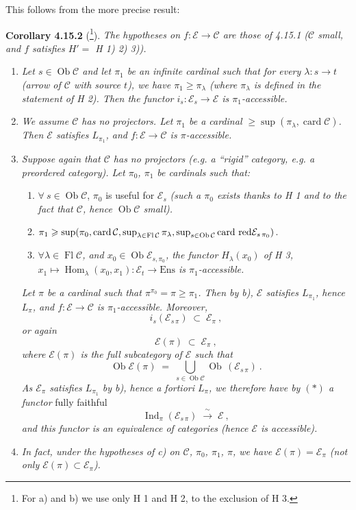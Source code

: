 \documentclass[11pt]{article}
\newcommand{\printedpage}[1]{\marginpar{\footnotesize p.~#1}}
\newcommand{\msp}[1]{\marginpar{\footnotesize [#1]}}
\newcommand{\cE}{\mathcal{E}}
\newcommand{\cC}{\mathcal{C}}
\newcommand{\Ob}{\operatorname{Ob}}
\newcommand{\Fl}{\operatorname{Fl}}
\newcommand{\Hom}{\operatorname{Hom}}
\newcommand{\Ind}{\operatorname{Ind}}
\newcommand{\Ens}{\mathrm{Ens}}
\newcommand{\card}{\operatorname{card}}
\newcommand{\cardred}{\operatorname{card}\,\text{\upshape red}}
\begin{document}
This follows from the more precise result:

\printedpage{162}

\msp{page 426}
\textbf{Corollary 4.15.2} (\footnote{For a) and b) we use only H 1 and H 2, to the exclusion of H 3.}). \textit{The hypotheses on $f : \cE \longrightarrow \cC$ are those of 4.15.1 ($\cC$ small, and $f$ satisfies $H' =$ H 1) 2) 3)).}
\begin{enumerate}
\item[\textit{a)}] \textit{Let $s \in \Ob\cC$ and let $\pi_1$ be an infinite cardinal such that for every $\lambda : s \longrightarrow t$ (arrow of $\cC$ with source $t$), we have $\pi_1 \geqslant \pi_\lambda$ (where $\pi_\lambda$ is defined in the statement of H 2). Then the functor $i_s : \cE_s \longrightarrow \cE$ is $\pi_1$-accessible.} %
\item[\textit{b)}] \textit{We assume $\cC$ has no projectors. Let $\pi_1$ be a cardinal $\geqslant \sup(\pi_\lambda, \card\cC)$. Then $\cE$ satisfies $L_{\pi_1}$, and $f : \cE \longrightarrow \cC$ is $\pi$-accessible.}
\item[\textit{c)}] \textit{Suppose again that $\cC$ has no projectors (e.g. a ``rigid'' category, e.g. a preordered category). Let $\pi_0$, $\pi_1$ be cardinals such that:}
\begin{enumerate}
\item[\textcircled{\footnotesize $1^o$}] $\forall\ s \in \Ob\cC$, $\pi_0$ is useful for $\cE_s$ \textit{(such a $\pi_0$ exists thanks to H 1 and to the fact that $\cC$, hence $\Ob\cC$ small).}
\item[\textcircled{\footnotesize $2^o$}] $\pi_1 \geqslant \sup(\pi_0, \card\cC, \sup_{\lambda\in\Fl\cC}\pi_\lambda, \sup_{s\in\Ob\cC} \cardred \cE_{s\,\pi_0})$.
\item[\textcircled{\footnotesize $3^o$}] \textit{$\forall\lambda \in \Fl\cC$, and $x_0 \in \Ob\cE_{s,\pi_0}$, the functor $H_\lambda(x_0)$ of H 3, $x_1 \longmapsto \Hom_\lambda(x_0,x_1) : \cE_t \longrightarrow \Ens$ is $\pi_1$-accessible.}
\end{enumerate}
\textit{Let $\pi$ be a cardinal such that $\pi^{\pi_0} = \pi \geqslant \pi_1$. Then by b), $\cE$ satisfies $L_{\pi_1}$, hence $L_\pi$, and $f : \cE \longrightarrow \cC$ is $\pi_1$-accessible. Moreover,}
\[
i_s(\cE_{s\,\pi}) \;\subset\; \cE_\pi\ ,
\]
\textit{or again}
\[
\cE(\pi) \;\subset\; \cE_\pi\ , \tag*{$(*)$}
\]
\textit{where $\cE(\pi)$ is the full subcategory of $\cE$ such that}
\[
\Ob\cE(\pi) \;=\; \bigcup_{s\in\Ob\cC} \Ob\,(\cE_{s\,\pi})\ .
\]
\textit{As $\cE_\pi$ satisfies $L_{\pi_1}$ by b), hence a fortiori $L_\pi$, we therefore have by $(*)$ a functor} fully faithful
\[
\Ind_\pi(\cE_{s\,\pi}) \;\xrightarrow{\ \sim\ }\; \cE\ ,
\]
\textit{and this functor is an equivalence of categories (hence $\cE$ is accessible).}
\item[\textit{d)}] \textit{In fact, under the hypotheses of c) on $\cC$, $\pi_0$, $\pi_1$, $\pi$, we have $\cE(\pi) = \cE_\pi$ (not only $\cE(\pi) \subset \cE_\pi$).}
\end{enumerate}
\end{document}
